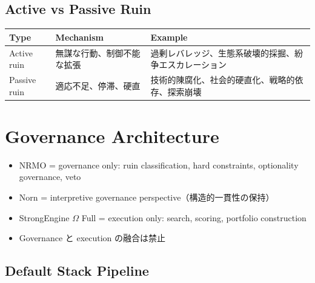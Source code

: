 \documentclass[11pt,a4paper]{article}
\theoremstyle{definition}\newtheorem{definition}{Definition}[section]
\begin{document}
\subsection{Active vs Passive Ruin}
\begin{table}[H]\centering\small
\begin{tabular}{@{}lp{4.5cm}p{6cm}@{}}\toprule
Type&Mechanism&Example\\\midrule
Active ruin&無謀な行動、制御不能な拡張&過剰レバレッジ、生態系破壊的採掘、紛争エスカレーション\\
Passive ruin&適応不足、停滞、硬直&技術的陳腐化、社会的硬直化、戦略的依存、探索崩壊\\
\bottomrule\end{tabular}
\end{table}


\section{Governance Architecture}

\begin{warning}
\begin{itemize}[leftmargin=1.5em]
  \item NRMO = governance only: ruin classification, hard constraints, optionality governance, veto
  \item Norn = interpretive governance perspective（構造的一貫性の保持）
  \item StrongEngine $\Omega$ Full = execution only: search, scoring, portfolio construction
  \item Governance と execution の融合は禁止
\end{itemize}
\end{warning}

\subsection{Default Stack Pipeline}
\end{document}
